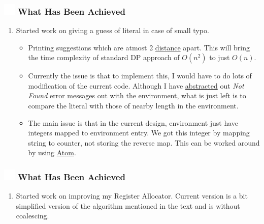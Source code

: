 \documentclass{beamer}
\newcommand{\ft}[1]{
  \frametitle{\includegraphics[height=0.55cm, width=0.55cm, keepaspectratio]{assets/tiger.png} #1}
}
\newcounter{saveenumi}
\newcommand{\seti}{\setcounter{saveenumi}{\value{enumi}}}
\newcommand{\conti}{\setcounter{enumi}{\value{saveenumi}}}
\begin{document}
\begin{frame}[fragile]
  \ft{What Has Been Achieved}
  \begin{enumerate}
    \conti
    \item Started work on giving a guess of literal in case of small typo. 
  \begin{itemize}
    \item Printing suggestions which are atmost 2 \href{https://en.wikipedia.org/wiki/Edit_distance}{distance} apart. This will bring the time complexity of standard DP approach of $O(n^2)$ to just $O(n)$. 
    \item Currently the issue is that to implement this, I would have to do lots of modification of the current code. Although I have \href{https://github.com/sourabh2311/btp/commit/8f27478a3c51b9e41bef68961a28c400d4ef29dd}{abstracted} out \textit{Not Found} error messages out with the environment, what is just left is to compare the literal with those of nearby length in the environment. 
    \item The main issue is that in the current design, environment just have integers mapped to environment entry. We got this integer by mapping string to counter, not storing the reverse map. This can be worked around by using \href{http://www.cs.utah.edu/~mjones/sml-nj-lib/atom.html}{Atom}.  
  \end{itemize}
    \seti
  \end{enumerate}
\end{frame}


\begin{frame}[fragile]
  \ft{What Has Been Achieved}
  \begin{enumerate}
    \conti
    \item Started work on improving my Register Allocator. Current version is a bit simplified version of the algorithm mentioned in the text and is without coalescing.
    \seti
  \end{enumerate}
\end{frame}
\end{document}
